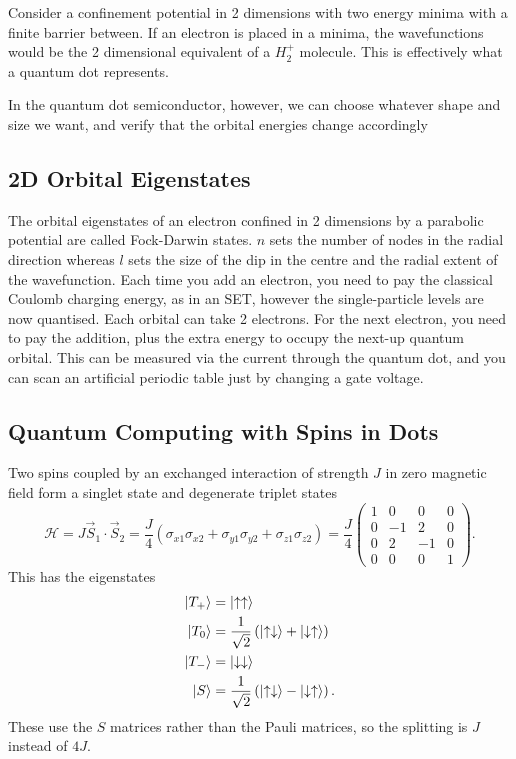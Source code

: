 \documentclass{article}
\begin{document}
Consider a confinement potential in 2 dimensions with two energy minima with a finite barrier between. If an electron is placed in a minima, the wavefunctions would be the 2 dimensional equivalent of a $H_2^+$ molecule. This is effectively what a quantum dot represents.

In the quantum dot semiconductor, however, we can choose whatever shape and size we want, and verify that the orbital energies change accordingly

\subsection{2D Orbital Eigenstates}
The orbital eigenstates of an electron confined in 2 dimensions by a parabolic potential are called Fock-Darwin states. $n$ sets the number of nodes in the radial direction whereas $l$ sets the size of the dip in the centre and the radial extent of the wavefunction. Each time you add an electron, you need to pay the classical Coulomb charging energy, as in an SET, however the single-particle levels are now quantised. Each orbital can take 2 electrons. For the next electron, you need to pay the addition, plus the extra energy to occupy the next-up quantum orbital. This can be measured via the current through the quantum dot, and you can scan an artificial periodic table just by changing a gate voltage.

\subsection{Quantum Computing with Spins in Dots}
Two spins coupled by an exchanged interaction of strength $J$ in zero magnetic field form a singlet state and degenerate triplet states 
\[
    \mathcal{H}=J \vec{S}_1 \cdot \vec{S}_2=\frac{J}{4}\left( \sigma _{x1}\sigma _{x 2}+\sigma _{y 1}\sigma _{y 2}+\sigma _{z 1}\sigma _{z 2} \right)=\frac{J}{4}\begin{pmatrix}
        1&0&0&0\\
        0&-1&2&0\\
        0&2&-1&0\\
        0&0&0&1
    \end{pmatrix}.
\]
This has the eigenstates
\begin{align*}
    \ket{T_+} &= \ket{\uparrow \uparrow}\\
    \ket{T_0}&= \frac{1}{\sqrt{2}}\left( \ket{\uparrow \downarrow}+\ket{\downarrow \uparrow} \right)\\
    \ket{T_-}&= \ket{\downarrow \downarrow}\\
    \ket{S}&= \frac{1}{\sqrt{2}}\left( \ket{\uparrow \downarrow}-\ket{\downarrow \uparrow} \right).
\end{align*}
These use the $S$ matrices rather than the Pauli matrices, so the splitting is $J$ instead of $4J$.
\end{document}
